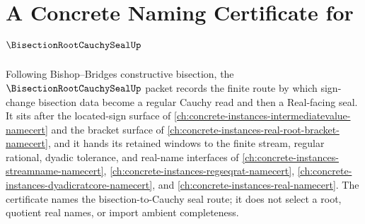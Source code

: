 \chapter{A Concrete Naming Certificate for $\BisectionRootCauchySealUp$}
\label{ch:concrete-instances-bisection-root-cauchy-seal-namecert}

Following Bishop--Bridges constructive bisection, the $\BisectionRootCauchySealUp$ packet records the finite route by which sign-change bisection data become a regular Cauchy read and then a Real-facing seal. It sits after the located-sign surface of \autoref{ch:concrete-instances-intermediatevalue-namecert} and the bracket surface of \autoref{ch:concrete-instances-real-root-bracket-namecert}, and it hands its retained windows to the finite stream, regular rational, dyadic tolerance, and real-name interfaces of \autoref{ch:concrete-instances-streamname-namecert}, \autoref{ch:concrete-instances-regseqrat-namecert}, \autoref{ch:concrete-instances-dyadicratcore-namecert}, and \autoref{ch:concrete-instances-real-namecert}. The certificate names the bisection-to-Cauchy seal route; it does not select a root, quotient real names, or import ambient completeness.

